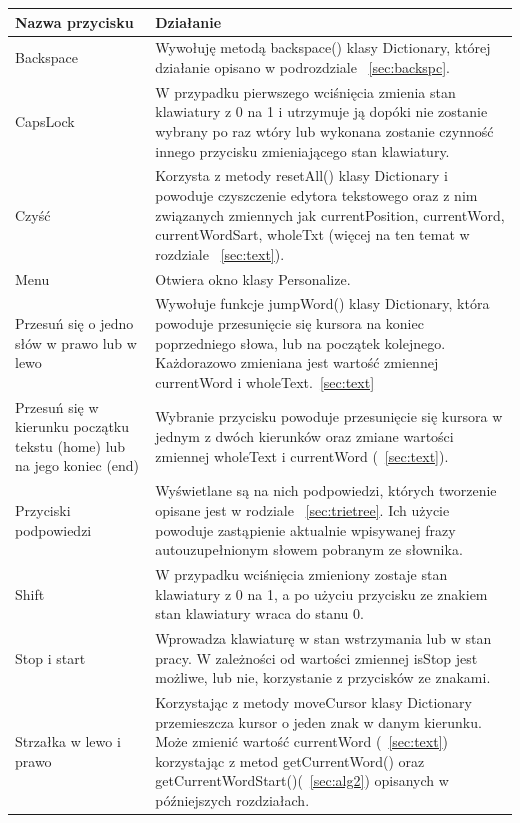 \documentclass[twoside,a4paper]{book}
\begin{document}
\begin{table}
  \renewcommand\arraystretch{1.2}
 \centering
    \begin{tabular}{|>{\centering\arraybackslash}m{4cm}|m{8.5cm}|}
        \hline
    \textbf{Nazwa przycisku} & \textbf{Działanie}\\ \hline
     Backspace & Wywołuję metodą backspace() klasy Dictionary, której działanie opisano w podrozdziale ~\ref{sec:backspc}.\\ \hline
    CapsLock & W przypadku pierwszego wciśnięcia zmienia stan kla\-wia\-tu\-ry z 0 na 1 i utrzymuje ją dopóki nie zostanie wybrany po raz wtóry lub wykonana zostanie czynność innego przycisku zmieniającego stan klawiatury. \\ \hline
 Czyść & Korzysta z metody resetAll() klasy \-Dictionary i po\-wo\-du\-je czyszczenie edytora tekstowego oraz z nim związanych zmiennych jak currentPosition, currentWord, currentWordSart, wholeTxt (więcej na ten temat w rozdziale ~\ref{sec:text}).\\ \hline
Menu & Otwiera okno klasy Personalize.\\ \hline
Przesuń się o jedno słów w prawo lub w lewo & Wywołuje funkcje jumpWord() klasy Dictionary, która powoduje przesunięcie się kursora na koniec po\-prze\-dnie\-go słowa, lub na początek kolejnego. Każdorazowo zmieniana jest wartość zmie\-nnej currentWord i wholeText.~\ref{sec:text}\\ \hline
 Przesuń się w kierunku początku tekstu (home) lub na jego koniec (end) & Wybranie przycisku powoduje przesunięcie się kursora w jednym z dwóch kierunków oraz zmiane wartości zmie\-nnej wholeText i currentWord (~\ref{sec:text}). \\ \hline
 Przyciski podpowiedzi & Wyświetlane są na nich podpowiedzi, których tworzenie opisane jest w rodziale ~\ref{sec:trietree}. Ich użycie powoduje zastąpienie aktualnie wpisywanej frazy autouzupełnionym słowem pobranym ze słownika. \\ \hline
  Shift & W przypadku wciśnięcia zmieniony zostaje stan kla\-wia\-tu\-ry z 0 na 1, a po użyciu przycisku ze znakiem stan kla\-wia\-tu\-ry wraca do stanu 0. \\ \hline
   Stop i start & Wprowadza kla\-wia\-tu\-rę w stan wstrzymania lub w stan pracy. W zależności od wartości zmiennej isStop jest możliwe, lub nie, korzystanie z przycisków ze znakami.\\ \hline
   Strzałka w lewo i prawo &  Korzystając z metody moveCursor klasy Dictionary przemieszcza kursor o jeden znak w danym kierunku. Może zmienić wartość currentWord (~\ref{sec:text}) korzystając z metod getCurrentWord() oraz getCurrentWordStart()(~\ref{sec:alg2}) opisanych w późniejszych rozdziałach.\\ \hline

\end{tabular}
\end{table}
\end{document}
